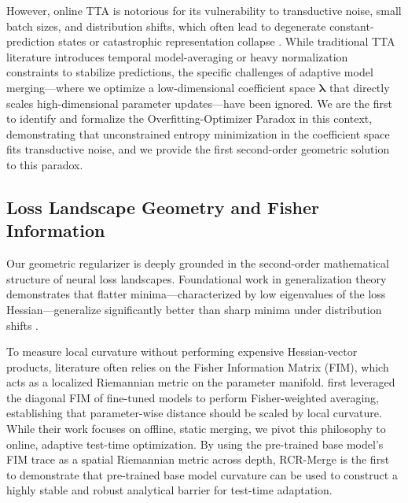 However, online TTA is notorious for its vulnerability to transductive noise, small batch sizes, and distribution shifts, which often lead to degenerate constant-prediction states or catastrophic representation collapse \citep{liao2021are}. While traditional TTA literature introduces temporal model-averaging or heavy normalization constraints to stabilize predictions, the specific challenges of adaptive model merging—where we optimize a low-dimensional coefficient space $\boldsymbol{\lambda}$ that directly scales high-dimensional parameter updates—have been ignored. We are the first to identify and formalize the Overfitting-Optimizer Paradox in this context, demonstrating that unconstrained entropy minimization in the coefficient space fits transductive noise, and we provide the first second-order geometric solution to this paradox.

\subsection{Loss Landscape Geometry and Fisher Information}
Our geometric regularizer is deeply grounded in the second-order mathematical structure of neural loss landscapes. Foundational work in generalization theory demonstrates that flatter minima—characterized by low eigenvalues of the loss Hessian—generalize significantly better than sharp minima under distribution shifts \citep{foret2020sharpness, cha2021swad, izmailov2018averaging}. 

To measure local curvature without performing expensive Hessian-vector products, literature often relies on the Fisher Information Matrix (FIM), which acts as a localized Riemannian metric on the parameter manifold. \citet{matena2021merging} first leveraged the diagonal FIM of fine-tuned models to perform Fisher-weighted averaging, establishing that parameter-wise distance should be scaled by local curvature. While their work focuses on offline, static merging, we pivot this philosophy to online, adaptive test-time optimization. By using the pre-trained base model's FIM trace as a spatial Riemannian metric across depth, RCR-Merge is the first to demonstrate that pre-trained base model curvature can be used to construct a highly stable and robust analytical barrier for test-time adaptation.